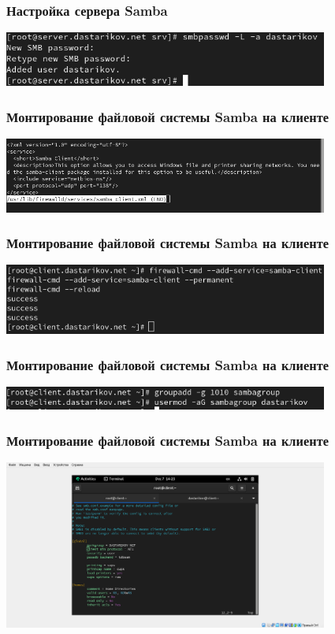\begin{frame}
\frametitle{Настройка сервера Samba}
    \includegraphics[width=0.8\textwidth]{../images/image12.png}
\end{frame}


\begin{frame}
\frametitle{Монтирование файловой системы Samba на клиенте}
    \includegraphics[width=0.8\textwidth]{../images/image13.png}
\end{frame}


\begin{frame}
\frametitle{Монтирование файловой системы Samba на клиенте}
    \includegraphics[width=0.8\textwidth]{../images/image14.png}
\end{frame}


\begin{frame}
\frametitle{Монтирование файловой системы Samba на клиенте}
    \includegraphics[width=0.8\textwidth]{../images/image15.png}
\end{frame}


\begin{frame}
\frametitle{Монтирование файловой системы Samba на клиенте}
    \includegraphics[width=0.8\textwidth]{../images/image17.png}
\end{frame}


